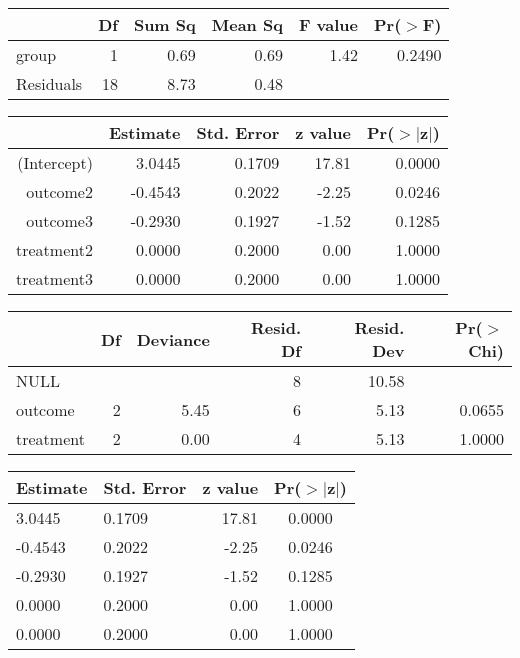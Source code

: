 \begin{table}[ht]
\centering
\begin{tabular}{lrrrrr}
  \hline
 & Df & Sum Sq & Mean Sq & F value & Pr($>$F) \\ 
  \hline
group & 1 & 0.69 & 0.69 & 1.42 & 0.2490 \\ 
  Residuals & 18 & 8.73 & 0.48 &  &  \\ 
   \hline
\end{tabular}
\end{table}
\begin{table}[ht]
\centering
\begin{tabular}{rrrrr}
  \hline
 & Estimate & Std. Error & z value & Pr($>$$|$z$|$) \\ 
  \hline
(Intercept) & 3.0445 & 0.1709 & 17.81 & 0.0000 \\ 
  outcome2 & -0.4543 & 0.2022 & -2.25 & 0.0246 \\ 
  outcome3 & -0.2930 & 0.1927 & -1.52 & 0.1285 \\ 
  treatment2 & 0.0000 & 0.2000 & 0.00 & 1.0000 \\ 
  treatment3 & 0.0000 & 0.2000 & 0.00 & 1.0000 \\ 
   \hline
\end{tabular}
\end{table}
\begin{table}[ht]
\centering
\begin{tabular}{lrrrrr}
  \hline
 & Df & Deviance & Resid. Df & Resid. Dev & Pr($>$Chi) \\ 
  \hline
NULL &  &  & 8 & 10.58 &  \\ 
  outcome & 2 & 5.45 & 6 & 5.13 & 0.0655 \\ 
  treatment & 2 & 0.00 & 4 & 5.13 & 1.0000 \\ 
   \hline
\end{tabular}
\end{table}
\begin{table}[ht]
\centering
\begin{tabular}{|llrc}
  \hline
Estimate & Std. Error & z value & Pr($>$$|$z$|$) \\ 
  \hline
3.0445 & 0.1709 & 17.81 & 0.0000 \\ 
  -0.4543 & 0.2022 & -2.25 & 0.0246 \\ 
  -0.2930 & 0.1927 & -1.52 & 0.1285 \\ 
  0.0000 & 0.2000 & 0.00 & 1.0000 \\ 
  0.0000 & 0.2000 & 0.00 & 1.0000 \\ 
   \hline
\end{tabular}
\end{table}
